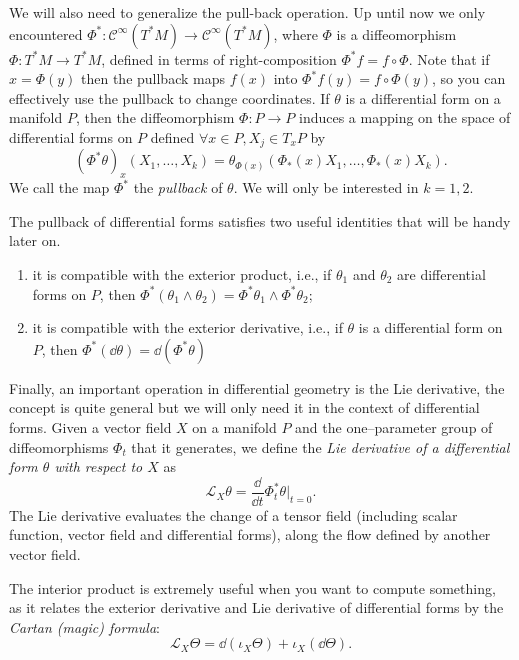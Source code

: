 \documentclass[english,fontsize=11pt,paper=b5]{scrbook}
\theoremstyle{definition}
\begin{document}
    We will also need to generalize the pull-back operation.
    Up until now we only encountered $\Phi^* : \mathcal{C}^\infty(T^*M) \to \mathcal{C}^\infty(T^*M)$, where $\Phi$ is a diffeomorphism $\Phi: T^*M \to T^*M$, defined in terms of right-composition $\Phi^* f = f \circ \Phi$.
    Note that if $x = \Phi(y)$ then the pullback maps $f(x)$ into $\Phi^* f (y) = f \circ \Phi (y)$, so you can effectively use the pullback to change coordinates.
    If $\theta$ is a differential form on a manifold $P$, then the diffeomorphism $\Phi : P \to P$ induces a mapping on the space of differential forms on $P$ defined $\forall x\in P, X_j\in T_xP$ by
    \begin{equation}
      (\Phi^{*}\theta)_{x}(X_{1},\ldots ,X_{k})=\theta_{\Phi(x)}(\Phi_*(x)X_{1},\ldots,\Phi_*(x)X_{k}).
    \end{equation}
    We call the map $\Phi^*$ the \emph{pullback} of $\theta$. We will only be interested in $k=1,2$.

    The pullback of differential forms satisfies two useful identities that will be handy later on.
    \begin{enumerate}
      \item it is compatible with the exterior product, i.e., if $\theta_1$ and $\theta_2$ are differential forms on $P$, then $\Phi^{*}(\theta_1 \wedge \theta_2) = \Phi^{*}\theta_1 \wedge \Phi^{*}\theta_2$;
      \item it is compatible with the exterior derivative, i.e., if $\theta$ is a differential form on $P$, then $\Phi^{*}(\dd\theta) = \dd(\Phi^{*}\theta)$
    \end{enumerate}

    Finally, an important operation in differential geometry is the Lie derivative, the concept is quite general but we will only need it in the context of differential forms.
    Given a vector field $X$ on a manifold $P$ and the one--parameter group of diffeomorphisms $\Phi_t$ that it generates, we define the \emph{Lie derivative of a differential form $\theta$ with respect to $X$} as
    \begin{equation}\label{eq:lie-derivative}
      \mathcal{L}_X \theta = \frac{\dd}{\dd t}\Phi_t^*\theta \Big|_{t=0}.
    \end{equation}
    The Lie derivative evaluates the change of a tensor field (including scalar function, vector field and differential forms), along the flow defined by another vector field.

    The interior product is extremely useful when you want to compute something, as it relates the exterior derivative and Lie derivative of differential forms by the \emph{Cartan (magic) formula}:
    \begin{equation}\label{eq:cartan}
      \mathcal{L}_X \Theta = \dd(\iota_X \Theta) + \iota_X (\dd{\Theta}).
    \end{equation}
\end{document}
